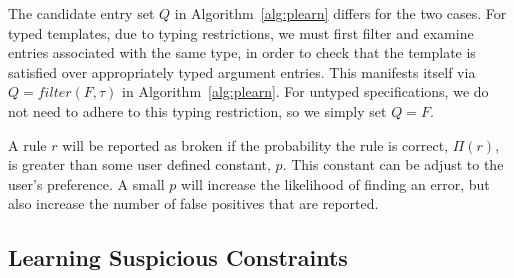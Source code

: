 The candidate entry set $Q$ in Algorithm~\ref{alg:plearn} 
differs for the two cases.
For typed templates, due to typing restrictions, 
we must first filter and examine entries associated with the same type, in order to check that 
the template is satisfied over appropriately typed argument entries. This manifests itself via $Q = filter(F,\tau)$
in Algorithm~\ref{alg:plearn}. For
untyped specifications, we do not need to adhere to this typing restriction, so we simply set $Q = F$.





A rule $r$ will be reported as broken if the probability the rule is
correct, $\Pi(r)$, is greater than some user defined constant, $p$. This
constant can be adjust to the user's preference. A small $p$ will
increase the likelihood of finding an error, but also increase the
number of false positives that are reported.
\fi

\subsection{Learning Suspicious Constraints}
\label{subsec-constraints}

